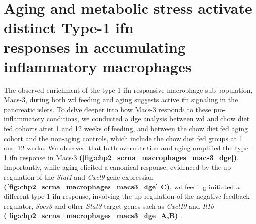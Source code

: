 \section[Aging and metabolic stress activate distinct type-1 \glslink{ifn}{IFN} responses in accumulating inflammatory macrophages]{Aging and metabolic stress activate distinct Type-1 \gls{ifn}\\responses in accumulating inflammatory macrophages}
\label{sec:sc_macs3_diff}
\par The observed enrichment of the type-1 \gls{ifn}-responsive macrophage sub-population, Macs-3, during both \gls{wd} feeding and aging suggests active \gls{ifn} signaling in the pancreatic islets. To delve deeper into how Macs-3 responds to these pro-inflammatory conditions, we conducted a \gls{dge} analysis between \gls{wd} and chow diet fed cohorts after 1 and 12 weeks of feeding, and between the chow diet fed aging cohort and the non-aging controls, which include the chow diet fed groups at 1 and 12 weeks. We observed that both overnutrition and aging amplified the type-1 \gls{ifn} response in Macs-3 \textbf{(\autoref{fig:chp2_scrna_macrophages_macs3_dge})}. Importantly, while aging elicited a canonical response, evidenced by the up-regulation of the \textit{Stat1} and \textit{Cxcl9} gene expression \textbf{(\autoref{fig:chp2_scrna_macrophages_macs3_dge} C)}, \gls{wd} feeding initiated a different type-1 \gls{ifn} response, involving the up-regulation of the negative feedback regulator, \textit{Socs3} and other \textit{Stat3} target genes such as \textit{Cxcl10} and \textit{Il1b} \textbf{(\autoref{fig:chp2_scrna_macrophages_macs3_dge} A,B)} \textbf{\cite{}}.\\

